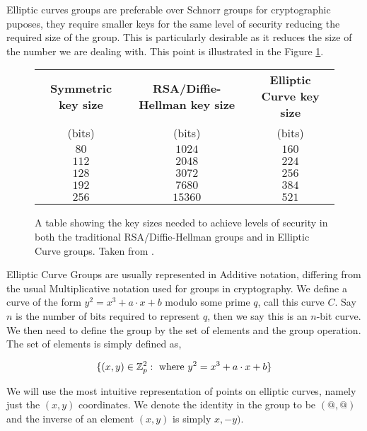 \documentclass[ %
                    author={Nicholas Tutte},
                supervisor={Prof. Nigel Smart},
                    degree={MEng},
                     title={Secure Two Party Computation},
                  subtitle={A practical comparison of recent protocols},
                      type={Research - GG1K},
                      year={2015} ]{dissertation}
\begin{document}
			Elliptic curves groups are preferable over Schnorr groups for cryptographic puposes, they require smaller keys for the same level of security reducing the required size of the group. This is particularly desirable as it reduces the size of the number we are dealing with. This point is illustrated in the Figure \ref{fig:NSA_ECC_Table}.\\

			\begin{figure}[!htb]
				\begin{tabular}{| c | c | c |}
					\hline
					\textbf{Symmetric key size} & \textbf{RSA/Diffie-Hellman key size} & \textbf{Elliptic Curve key size} \\
					(bits) & (bits) & (bits) \\
					\hline
					\hline
					$80$ & $1024$ & $160$ \\
					\hline
					$112$ & $2048$ & $224$ \\
					\hline
					$128$ & $3072$ & $256$ \\
					\hline
					$192$ & $7680$ & $384$ \\
					\hline
					$256$ & $15360$ & $521$ \\
					\hline
				\end{tabular}

				\caption{A table showing the key sizes needed to achieve levels of security in both the traditional RSA/Diffie-Hellman groups and in Elliptic Curve groups. Taken from \cite{NSA_CaseForECC}. \label{fig:NSA_ECC_Table}}
			\end{figure}

			Elliptic Curve Groups are usually represented in Additive notation, differing from the usual Multiplicative notation used for groups in cryptography. We define a curve of the form $y^2 = x^3 + a\cdot x + b$ modulo some prime $q$, call this curve $C$. Say $n$ is the number of bits required to represent $q$, then we say this is an $n$-bit curve.\\

			We then need to define the group by the set of elements and the group operation. The set of elements is simply defined as,

			$$\{(x, y) \in \mathbb{Z}_p^2 : \textnormal{ where } y^2 = x^3 + a\cdot x + b\} $$

			We will use the most intuitive representation of points on elliptic curves, namely just the $(x, y)$ coordinates. We denote the identity in the group to be $(@, @)$ and the inverse of an element $(x, y)$ is simply $x, -y)$.\\
\end{document}
